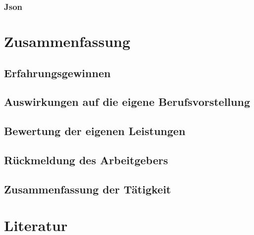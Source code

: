 \documentclass[12pt,a4paper]{report}
\begin{document}
\subsection{Json}

\chapter{Zusammenfassung}

\section{Erfahrungsgewinnen}

\section{Auswirkungen auf die eigene Berufsvorstellung}

\section{Bewertung der eigenen Leistungen}

\section{Rückmeldung des Arbeitgebers}

\section{Zusammenfassung der Tätigkeit}

\chapter{Literatur}
 
	                      	
\end{document}
